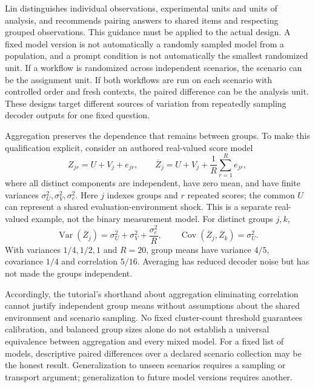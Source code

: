 Lin distinguishes individual observations, experimental units and units of
analysis, and recommends pairing answers to shared items and respecting grouped
observations. This guidance must be applied to the actual design. A fixed model
version is not automatically a randomly sampled model from a population, and a
prompt condition is not automatically the smallest randomized unit. If a
workflow is randomized across independent scenarios, the scenario can be the
assignment unit. If both workflows are run on each scenario with controlled
order and fresh contexts, the paired difference can be the analysis unit. These
designs target different sources of variation from repeatedly sampling decoder
outputs for one fixed question. \citep{exec20_validity}

Aggregation preserves the dependence that remains between groups. To make this
qualification explicit, consider an authored real-valued score model
\begin{equation}
 Z_{jr}=U+V_j+e_{jr},\qquad
 \overline Z_j=U+V_j+\frac{1}{R}\sum_{r=1}^R e_{jr},
 \label{exec20:validity-shock}
\end{equation}
where all distinct components are independent, have zero mean, and have finite
variances $\sigma_U^2,\sigma_V^2,\sigma_e^2$. Here $j$ indexes groups and $r$
repeated scores; the common $U$ can represent a shared evaluation-environment
shock. This is a separate real-valued example, not the binary measurement model.
For distinct groups $j,k$,
\begin{equation}
 \operatorname{Var}(\overline Z_j)
 =\sigma_U^2+\sigma_V^2+\frac{\sigma_e^2}{R},\qquad
 \operatorname{Cov}(\overline Z_j,\overline Z_k)=\sigma_U^2.
 \label{exec20:validity-averages}
\end{equation}
With variances $1/4,1/2,1$ and $R=20$, group means have variance $4/5$,
covariance $1/4$ and correlation $5/16$. Averaging has reduced decoder noise
but has not made the groups independent. \citep{exec20_validity_reference}

Accordingly, the tutorial's shorthand about aggregation eliminating correlation
cannot justify independent group means without assumptions about the shared
environment and scenario sampling. No fixed cluster-count threshold guarantees
calibration, and balanced group sizes alone do not establish a universal
equivalence between aggregation and every mixed model. For a fixed list of
models, descriptive paired differences over a declared scenario collection may
be the honest result. Generalization to unseen scenarios requires a sampling or
transport argument; generalization to future model versions requires another.

